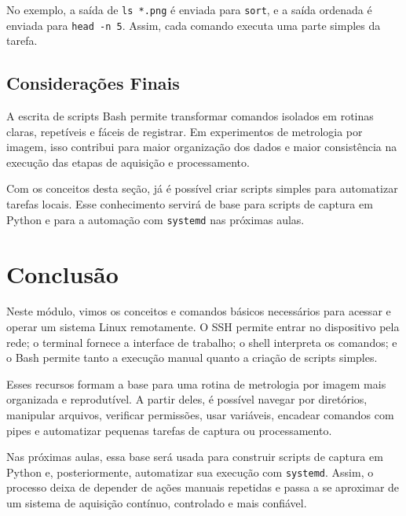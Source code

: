 \documentclass[12pt]{article}
\begin{document}
No exemplo, a saída de \texttt{ls *.png} é enviada para \texttt{sort}, e a saída ordenada é enviada para \texttt{head -n 5}. Assim, cada comando executa uma parte simples da tarefa.

\subsection{Considerações Finais}

A escrita de scripts Bash permite transformar comandos isolados em rotinas claras, repetíveis e fáceis de registrar. Em experimentos de metrologia por imagem, isso contribui para maior organização dos dados e maior consistência na execução das etapas de aquisição e processamento.

Com os conceitos desta seção, já é possível criar scripts simples para automatizar tarefas locais. Esse conhecimento servirá de base para scripts de captura em Python e para a automação com \texttt{systemd} nas próximas aulas.

\section{Conclusão}

Neste módulo, vimos os conceitos e comandos básicos necessários para acessar e operar um sistema Linux remotamente. O SSH permite entrar no dispositivo pela rede; o terminal fornece a interface de trabalho; o shell interpreta os comandos; e o Bash permite tanto a execução manual quanto a criação de scripts simples.

Esses recursos formam a base para uma rotina de metrologia por imagem mais organizada e reprodutível. A partir deles, é possível navegar por diretórios, manipular arquivos, verificar permissões, usar variáveis, encadear comandos com pipes e automatizar pequenas tarefas de captura ou processamento.

Nas próximas aulas, essa base será usada para construir scripts de captura em Python e, posteriormente, automatizar sua execução com \texttt{systemd}. Assim, o processo deixa de depender de ações manuais repetidas e passa a se aproximar de um sistema de aquisição contínuo, controlado e mais confiável.
\end{document}
